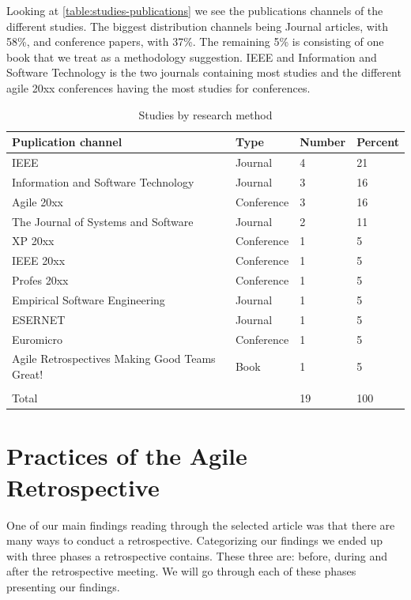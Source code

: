\documentclass[12pt]{article}
\begin{document}
Looking at \autoref{table:studies-publications} we see the publications channels of the different studies. The biggest distribution channels being Journal articles, with 58\%, and conference papers, with 37\%. The remaining 5\% is consisting of one book that we treat as a methodology suggestion. IEEE and Information and Software Technology is the two journals containing most studies and the different agile 20xx conferences having the most studies for conferences. 

\begin{table}[!h]
	\centering
	\caption{Studies by research method}
	\label{table:studies-publications}
	\begin{tabular}{ p{} p{} p{} p{}}
		\hline
		Puplication channel & Type & Number & Percent \\ \hline
		IEEE & Journal & 4 & 21 \\
		Information and Software Technology & Journal & 3 & 16 \\
		Agile 20xx & Conference & 3 & 16 \\
		The Journal of Systems and Software & Journal & 2 & 11 \\
		XP 20xx & Conference & 1 & 5 \\
		IEEE  20xx & Conference & 1 & 5 \\
		Profes 20xx & Conference & 1 & 5 \\
		Empirical Software Engineering & Journal & 1 & 5 \\
		ESERNET & Journal & 1 & 5 \\
		Euromicro & Conference & 1 & 5 \\
		Agile Retrospectives Making Good Teams Great! & Book & 1 & 5 \\
		\\
		Total & & 19 & 100 \\ \hline
	\end{tabular}
\end{table}

\section{Practices of the Agile Retrospective}
One of our main findings reading through the selected article was that there are many ways to conduct a retrospective. Categorizing our findings we ended up with three phases a retrospective contains. These three are: before, during and after the retrospective meeting. We will go through each of these phases presenting our findings.
\end{document}
